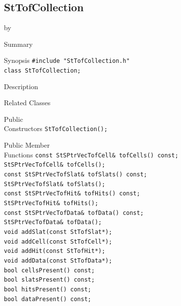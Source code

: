 \documentclass[twoside]{article}
\newcommand{\entrylabel}[1]{\mbox{\textbf{{#1}}}\hfil}%
\newenvironment{entry}
{\begin{list}{}%
    {\renewcommand{\makelabel}{\entrylabel}%
     \setlength{\labelwidth}{90pt}%
     \setlength{\leftmargin}{\labelwidth}
     \advance\leftmargin by \labelsep%
      }%
    }%
  {\end{list}}
\newcommand{\Entrylabel}[1]%
{\raisebox{0pt}[1ex][0pt]{\makebox[\labelwidth][l]%
    {\parbox[t]{\labelwidth}{\hspace{0pt}\textbf{{#1}}}}}}
\newenvironment{Entry}%
{\renewcommand{\entrylabel}{\Entrylabel}\begin{entry}}%
  {\end{entry}}
\begin{document}
\subsection{StTofCollection}
\label{sec:StTofCollection}
\begin{Entry}
\item[Summary]
\item[Synopsis]
    \verb+#include "StTofCollection.h"+\\
    \verb+class StTofCollection;+\\
\item[Description]
\item[Related Classes]
\item[Public\\ Constructors]
    \verb+StTofCollection();+\\
\item[Public Member\\ Functions]
    \verb+const StSPtrVecTofCell& tofCells() const;+\\
    \verb+StSPtrVecTofCell& tofCells();+\\
    \verb+const StSPtrVecTofSlat& tofSlats() const;+\\
    \verb+StSPtrVecTofSlat& tofSlats();+\\
    \verb+const StSPtrVecTofHit& tofHits() const;+\\
    \verb+StSPtrVecTofHit& tofHits();+\\
    \verb+const StSPtrVecTofData& tofData() const;+\\
    \verb+StSPtrVecTofData& tofData();+\\
    \verb+void addSlat(const StTofSlat*);+\\
    \verb+void addCell(const StTofCell*);+\\
    \verb+void addHit(const StTofHit*);+\\
    \verb+void addData(const StTofData*); +\\
    \verb+bool cellsPresent() const;+\\
    \verb+bool slatsPresent() const;+\\
    \verb+bool hitsPresent() const;+\\
    \verb+bool dataPresent() const;+\\
\end{Entry}
\clearpage
\end{document}
